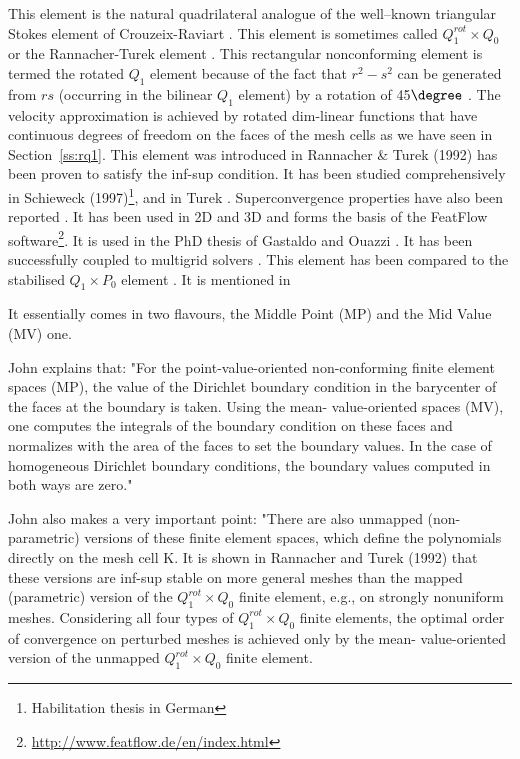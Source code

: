 This element is the natural quadrilateral analogue
of the well–known triangular Stokes element of Crouzeix-Raviart \cite{crra73}.
This element is sometimes called $Q_1^{rot} \times Q_0$ or the Rannacher-Turek element 
\cite[Section 3.6.5]{john16}.
This rectangular nonconforming \cite{crfa89} element is termed the rotated $Q_1$ element 
because of the fact that $r^2-s^2$ can be generated from $rs$ (occurring in the bilinear $Q_1$ 
element) by a rotation of 45$\degree$ \cite[p93]{chen}.
The velocity approximation is achieved by rotated dim-linear functions that have 
continuous degrees of freedom on
the faces of the mesh cells as we have seen in Section~\ref{ss:rq1}.
This element was introduced in Rannacher \& Turek (1992) \cite{ratu92} 
has been proven to satisfy the inf-sup condition. It has been studied comprehensively in Schieweck 
(1997)\footnote{Habilitation thesis in German}, \cite{shzh06} and in Turek \cite{ture94,ture96}.
Superconvergence properties have also been reported \cite{misx06,misx07}.
It has been used in 2D \cite{maky17} and 3D \cite{klll96,gekm08} and forms the basis of the FeatFlow 
software\footnote{\url{http://www.featflow.de/en/index.html}}. 
It is used in the PhD thesis of Gastaldo \cite{gast07} and Ouazzi \cite{ouaz05}.
It has been 
successfully coupled to multigrid solvers \cite{chos98,tuos02}.
This element has been compared to the stabilised $Q_1\times P_0$ element \cite{lisi12}.
It is mentioned in \cite{hans11}

It essentially comes in two flavours, the Middle Point (MP) and the Mid Value (MV) one.

\begin{remark} 
John \cite{john16} explains that: "For the point-value-oriented non-conforming finite element spaces (MP), 
the value of the Dirichlet boundary
condition in the barycenter of the faces at the boundary is taken. Using the mean-
value-oriented spaces (MV), one computes the integrals of the boundary condition on
these faces and normalizes with the area of the faces to set the boundary values.
In the case of homogeneous Dirichlet boundary conditions, the boundary values
computed in both ways are zero."
\end{remark}

\begin{remark} 
John also makes a very important point: "There are also unmapped (non-parametric) versions of 
these finite element spaces, which define the polynomials directly on the mesh cell K. It is shown in Rannacher
and Turek (1992) \cite{ratu92} that these versions are inf-sup stable on more general meshes than
the mapped (parametric) version of the $Q_1^{rot}\times Q_0$ finite element, e.g., on strongly
nonuniform meshes. Considering all four types of $Q_1^{rot}\times Q_0$ finite elements, the
optimal order of convergence on perturbed meshes is achieved only by the mean-
value-oriented version of the unmapped $Q_1^{rot}\times Q_0$   finite element.
\end{remark}

